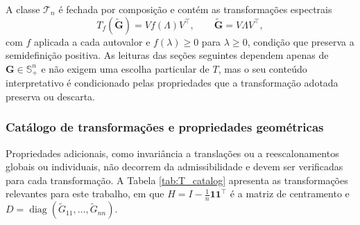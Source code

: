 A classe $\mathcal{T}_n$ é fechada por composição e contém as transformações espectrais
\begin{equation}\label{eq:spectral_transformation}
    T_f(\widetilde{\mathbf{G}}) = V f(\Lambda)V^\top, \qquad \widetilde{\mathbf{G}} = V\Lambda V^\top,
\end{equation}
com $f$ aplicada a cada autovalor e $f(\lambda)\geq 0$ para $\lambda\geq 0$, condição que preserva a semidefinição positiva. As leituras das seções seguintes dependem apenas de $\mathbf{G}\in\mathbb{S}_+^n$ e não exigem uma escolha particular de $T$, mas o seu conteúdo interpretativo é condicionado pelas propriedades que a transformação adotada preserva ou descarta.

\subsubsection*{Catálogo de transformações e propriedades geométricas}

Propriedades adicionais, como invariância a translações ou a reescalonamentos globais ou individuais, não decorrem da admissibilidade e devem ser verificadas para cada transformação. A Tabela \ref{tab:T_catalog} apresenta as transformações relevantes para este trabalho, em que $H = I - \frac{1}{n}\mathbf{1}\mathbf{1}^{\top}$ é a matriz de centramento e $D = \operatorname{diag}(\widetilde{G}_{11},\dots,\widetilde{G}_{nn})$.

